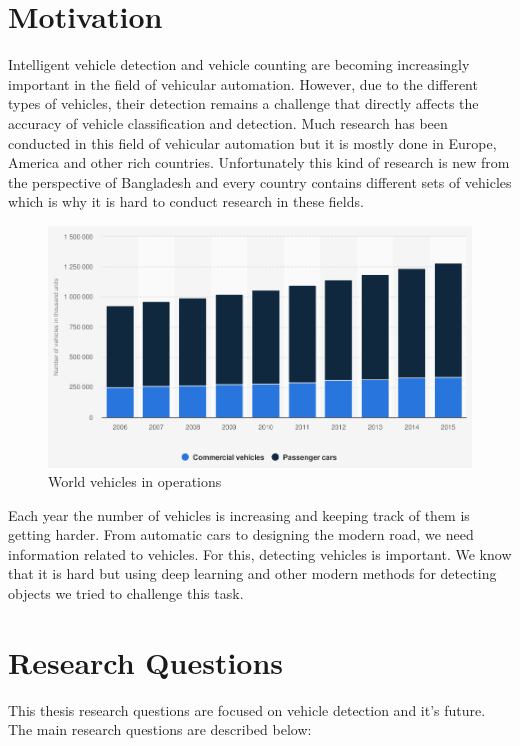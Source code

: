 \section{Motivation}
Intelligent vehicle detection and vehicle counting are becoming increasingly important in the field of vehicular automation. However, due to the different types of vehicles, their detection remains a challenge that directly affects the accuracy of vehicle classification and detection. Much research has been conducted in this field of vehicular automation but it is mostly done in Europe, America and  other rich countries. Unfortunately this kind of research is new from the perspective of Bangladesh and every country contains different sets of vehicles which is why it is hard to conduct research in these fields. 
\begin{figure}[ht]
    \centering
    \includegraphics[max width=\textwidth]{images/ours/statistic_id281134_number-of-vehicles-in-use-worldwide-2006-2015.png}
   \caption[World Vehicles in Operations]{ World vehicles in operations \cite{vehicleinoperation}}
    \label{fig:world_vehicle_stat}
\end{figure}
Each year the number of vehicles is increasing and keeping track of them is getting harder. From automatic cars to designing the modern road, we need information related to vehicles. For this, detecting vehicles is important. We know that it is hard but using deep learning and other modern methods for detecting objects we tried to challenge this task. 

\newpage

\section{Research Questions}
This thesis research questions are focused on vehicle detection and it's future. The main research questions are described below:

